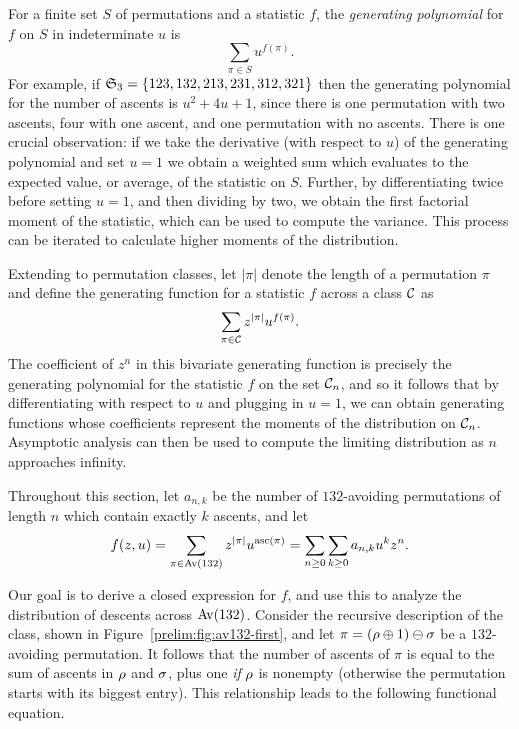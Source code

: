    For a finite set $S$ of permutations and a statistic $f$, the
    \emph{generating polynomial} for $f$ on $S$ in indeterminate $u$ is 
    $$ \sum_{\pi \in S} u^{f(\pi)}.$$
    For example, if $\S_3 = \{123, 132, 213, 231, 312, 321\}$ then the generating
    polynomial for the number of ascents is $u^2 + 4u + 1$, since there is one
    permutation with two ascents, four with one ascent, and one permutation
    with no ascents. There is one crucial observation: if we take the
    derivative (with respect to $u$) of the generating polynomial and set $u=1$
    we obtain a weighted sum which evaluates to the expected value, or average,
    of the statistic on $S$. Further, by differentiating twice before setting
    $u=1$, and then dividing by two, we obtain the first factorial moment of
    the statistic, which can be used to compute the variance. This process can
    be iterated to calculate higher moments of the distribution. 

    Extending to permutation classes, let $|\pi|$ denote the length of a
    permutation $\pi$ and define the generating function for a statistic $f$
    across a class $\C$ as
    $$ \sum_{\pi \in \C} z^{|\pi|} u^{f(\pi)}.$$
    The coefficient of $z^n$ in this bivariate generating function is precisely
    the generating polynomial for the statistic $f$ on the set $\C_n$, and so
    it follows that by differentiating with respect to $u$ and plugging in
    $u=1$, we can obtain generating functions whose coefficients represent the
    moments of the distribution on $\C_n$. Asymptotic analysis can then be used
    to compute the limiting distribution as $n$ approaches infinity. 



    Throughout this section, let $a_{n,k}$ be the number of $132$-avoiding
    permutations of length $n$ which contain exactly $k$ ascents, and let
    $$f(z,u) = \sum_{\pi \in \Av(132)} z^{|\pi|} u^{\asc(\pi)} = 
              \sum_{n \geq 0} \sum_{k \geq 0} a_{n,k} u^k z^n.$$

    Our goal is to derive a closed expression for $f$, and use this to analyze
    the distribution of descents across $\Av(132)$. Consider the recursive
    description of the class, shown in Figure~\ref{prelim:fig:av132-first}, and
    let $\pi = (\ro \dsum 1) \ssum \sg$ be a $132$-avoiding permutation. It
    follows that the number of ascents of $\pi$ is equal to the sum of ascents
    in $\ro$ and $\sg$, plus one \emph{if} $\ro$ is nonempty (otherwise the
    permutation starts with its biggest entry).
    This relationship leads to the following functional equation. 

